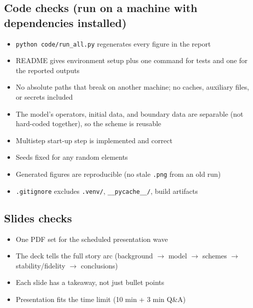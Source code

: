 \documentclass[11pt]{article}
\begin{document}
\subsection*{Code checks (run on a machine with dependencies installed)}
\begin{itemize}[leftmargin=2.4em, itemsep=1pt]
  \item[$\square$] \texttt{python code/run\_all.py} regenerates every figure in the report
  \item[$\square$] README gives environment setup plus one command for tests
    and one for the reported outputs
  \item[$\square$] No absolute paths that break on another machine; no caches,
    auxiliary files, or secrets included
  \item[$\square$] The model's operators, initial data, and boundary data are
    separable (not hard-coded together), so the scheme is reusable
  \item[$\square$] Multistep start-up step is implemented and correct
  \item[$\square$] Seeds fixed for any random elements
  \item[$\square$] Generated figures are reproducible (no stale \texttt{.png} from an old run)
  \item[$\square$] \texttt{.gitignore} excludes \texttt{.venv/}, \texttt{\_\_pycache\_\_/},
    build artifacts
\end{itemize}

\subsection*{Slides checks}
\begin{itemize}[leftmargin=2.4em, itemsep=1pt]
  \item[$\square$] One PDF set for the scheduled presentation wave
  \item[$\square$] The deck tells the full story arc (background $\to$ model $\to$ schemes $\to$ stability/fidelity $\to$ conclusions)
  \item[$\square$] Each slide has a takeaway, not just bullet points
  \item[$\square$] Presentation fits the time limit (10 min + 3 min Q\&A)
\end{itemize}
\end{document}
